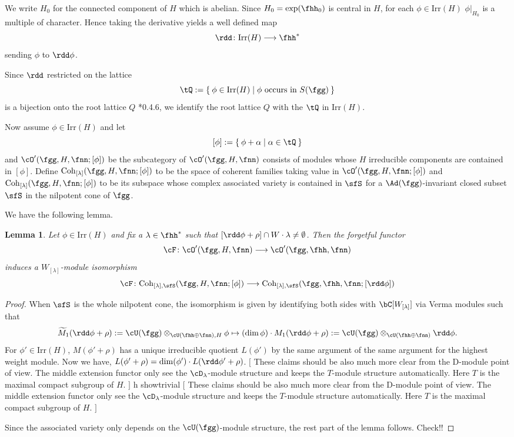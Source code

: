 \documentclass[12pt,a4paper]{amsart}
\newcommand{\trivial}[2][]{\if\relax\detokenize{#1}\relax
  {%
      \color{orange} \vspace{0em} $[$  #2 $]$
      \color{black}
  }
  \else
\ifx#1h
\ifcsname showtrivial\endcsname
{%
    \color{orange} \vspace{0em}  $[$ #2 $]$
    \color{black}
}
\fi
\else {\red Wrong argument!} \fi
\fi
}
\newcommand{\wtM}{\widetilde{M}}
\numberwithin{equation}{section}
\newtheorem{lem}[thm]{Lemma}
\theoremstyle{remark}
\def\Irr{\mathrm{Irr}}
\def\Coh{\mathrm{Coh}}
\def\dphi{\rdd \phi}
\begin{document}
We write $H_{0}$ for the connected component of $H$ which is abelian.
Since $H_{0} = \exp(\fhh_{0})$ is central in $H$, for each $\phi\in \Irr(H)$
$\phi|_{H_{0}}$ is a multiple of character.
Hence taking the derivative yields a
well defined map
\[
\rdd \colon \Irr(H)\longrightarrow \fhh^{*}
\]
sending $\phi$ to $\dphi$.


Since $\rdd$ restricted on the lattice
\[
\tQ:=\Set{\phi\in \Irr(H)|\phi \text{
    occurs in } S(\fgg)}
\]
 is a bijection onto the root lattice $Q$ \cite{Vg}*{0.4.6}, we identify the root lattice $Q$ with the $\tQ$ in $\Irr(H)$.


Now assume $\phi\in \Irr(H)$ and let
\[
  [\phi] := \Set{\phi+\alpha| \alpha\in \tQ}
\]
and
$\cO'(\fgg,H,\fnn;[\phi])$ be the subcategory of $\cO'(\fgg,H,\fnn)$
consists of modules whose $H$ irreducible components are contained in $[\phi]$.
Define $\Coh_{[\lambda]}(\fgg,H,\fnn;[\phi])$ to be the space of coherent
families taking value in $\cO'(\fgg,H,\fnn;[\phi])$ and
$\Coh_{[\lambda]}(\fgg,H,\fnn;[\phi])$ to be its subspace whose complex
associated variety is contained in $\sfS$ for a $\Ad(\fgg)$-invariant closed subset $\sfS$ in the nilpotent cone of
$\fgg$.


We have the following lemma.
\begin{lem}
  Let $\phi\in \Irr(H)$ and fix a $\lambda\in \fhh^{*}$ such that
  $[\rdd \phi + \rho ]\cap W\cdot \lambda\neq \emptyset$.
  Then the forgetful functor
  \[
    \cF\colon \cO'(\fgg,H,\fnn)\longrightarrow \cO'(\fgg,\fhh,\fnn)
  \]
  induces a $W_{[\lambda]}$-module isomorphism
  \[
    \cF\colon \Coh_{[\lambda],\sfS}(\fgg,H,\fnn;[\phi])\longrightarrow
    \Coh_{[\lambda],\sfS}(\fgg,\fhh,\fnn;[\rdd\phi])
  \]
\end{lem}
\begin{proof}
  When $\sfS$ is the whole nilpotent cone, the isomorphism is
  given by identifying both sides with $\bC[W_{[\lambda]}]$ via Verma modules
  such that
  \[
  \wtM_{1}(\rdd \phi+\rho):=\cU(\fgg)\otimes_{\cU(\fhh\oplus\fnn),H}\phi
  \mapsto (\dim\phi)\cdot M_{1}(\rdd\phi+\rho):= \cU(\fgg)\otimes_{\cU(\fhh\oplus\fnn)}\rdd\phi.
  \]
  For $\phi'\in \Irr(H)$, $M(\phi'+\rho)$ has a unique irreducible quotient
  $L(\phi')$ by the same argument of the same argument for the highest weight module.   Now we have, $L(\phi'+\rho) = \dim(\phi')\cdot L(\rdd\phi'+\rho)$.
  \trivial{
    These claims should be also much more clear from the D-module point of view.
    The middle extension functor only see the $\cD_{\lambda}$-module structure
    and keeps the $T$-module structure automatically. Here $T$ is the maximal
    compact subgroup of $H$.
  }
  Since the associated variety only depends on the $\cU(\fgg)$-module structure,
  the rest part of the lemma follows.   {\color{red} Check!!}
\end{proof}
\end{document}
